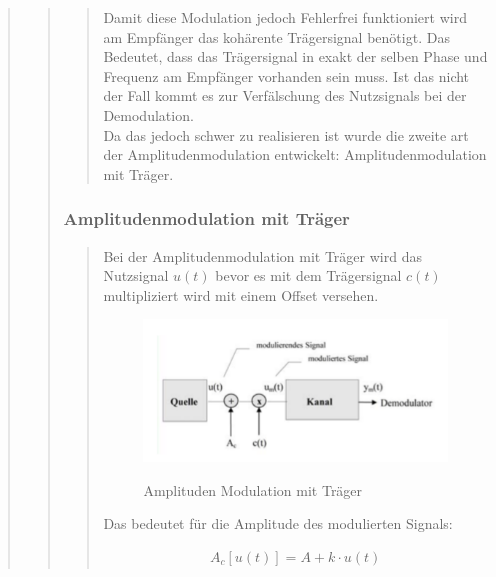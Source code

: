 \begin{quote}
\begin{quote}
\begin{quote}
             Damit diese Modulation jedoch Fehlerfrei funktioniert wird am Empfänger das kohärente Trägersignal
             benötigt. Das Bedeutet, dass das Trägersignal in exakt der selben Phase und Frequenz am Empfänger vorhanden
             sein muss. Ist das nicht der Fall kommt es zur Verfälschung des Nutzsignals bei der Demodulation.\\
             Da das jedoch schwer zu realisieren ist wurde die zweite art der Amplitudenmodulation entwickelt:
             Amplitudenmodulation mit Träger.
             
            
		\end{quote}
		
		\subsubsection{Amplitudenmodulation mit Träger}
		\begin{quote}
			Bei der Amplitudenmodulation mit Träger wird das Nutzsignal $u(t)$ bevor es mit dem Trägersignal $c(t)$
			multipliziert wird mit einem Offset versehen.
			
			\begin{figure}[H]
            \centering
                \includegraphics[scale=0.7, trim = 0cm 0cm 0cm 0cm, clip]{./Bilder/AMmitTraeger}
                    \caption{Amplituden Modulation mit Träger}
                    \cite{AMmitUeber}
            \end{figure}
            
            Das bedeutet für die Amplitude des modulierten Signals:
            
            \begin{equation*}
                \begin{split}
                    A_c [u(t)] = A + k \cdot u(t)
                \end{split}
            \end{equation*}
    

\end{quote}
\end{quote}
\end{quote}
